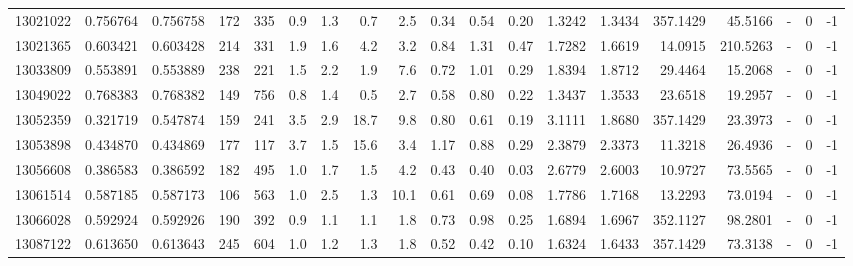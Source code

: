 \begin{tabular}{rrrrrrrrrrrrrrrrlrr}
  13021022 & 0.756764 &   0.756758 &  172 &  335 &      0.9 &      1.3 &     0.7 &      2.5 &       0.34 &        0.54 &        0.20 &  1.3242 &  1.3434 &  357.1429 &   45.5166 &             - &        0 &         -1 \\
  13021365 & 0.603421 &   0.603428 &  214 &  331 &      1.9 &      1.6 &     4.2 &      3.2 &       0.84 &        1.31 &        0.47 &  1.7282 &  1.6619 &   14.0915 &  210.5263 &             - &        0 &         -1 \\
  13033809 & 0.553891 &   0.553889 &  238 &  221 &      1.5 &      2.2 &     1.9 &      7.6 &       0.72 &        1.01 &        0.29 &  1.8394 &  1.8712 &   29.4464 &   15.2068 &             - &        0 &         -1 \\
  13049022 & 0.768383 &   0.768382 &  149 &  756 &      0.8 &      1.4 &     0.5 &      2.7 &       0.58 &        0.80 &        0.22 &  1.3437 &  1.3533 &   23.6518 &   19.2957 &             - &        0 &         -1 \\
  13052359 & 0.321719 &   0.547874 &  159 &  241 &      3.5 &      2.9 &    18.7 &      9.8 &       0.80 &        0.61 &        0.19 &  3.1111 &  1.8680 &  357.1429 &   23.3973 &             - &        0 &         -1 \\
  13053898 & 0.434870 &   0.434869 &  177 &  117 &      3.7 &      1.5 &    15.6 &      3.4 &       1.17 &        0.88 &        0.29 &  2.3879 &  2.3373 &   11.3218 &   26.4936 &             - &        0 &         -1 \\
  13056608 & 0.386583 &   0.386592 &  182 &  495 &      1.0 &      1.7 &     1.5 &      4.2 &       0.43 &        0.40 &        0.03 &  2.6779 &  2.6003 &   10.9727 &   73.5565 &             - &        0 &         -1 \\
  13061514 & 0.587185 &   0.587173 &  106 &  563 &      1.0 &      2.5 &     1.3 &     10.1 &       0.61 &        0.69 &        0.08 &  1.7786 &  1.7168 &   13.2293 &   73.0194 &             - &        0 &         -1 \\
  13066028 & 0.592924 &   0.592926 &  190 &  392 &      0.9 &      1.1 &     1.1 &      1.8 &       0.73 &        0.98 &        0.25 &  1.6894 &  1.6967 &  352.1127 &   98.2801 &             - &        0 &         -1 \\
  13087122 & 0.613650 &   0.613643 &  245 &  604 &      1.0 &      1.2 &     1.3 &      1.8 &       0.52 &        0.42 &        0.10 &  1.6324 &  1.6433 &  357.1429 &   73.3138 &             - &        0 &         -1 \\

\end{tabular}
